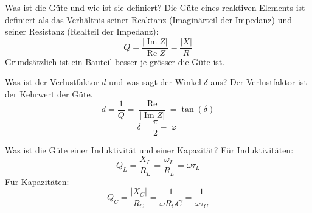 
\begin{karte}{Was ist die Güte und wie ist sie definiert?}
	Die Güte eines reaktiven Elements ist definiert als das Verhältnis seiner Reaktanz (Imaginärteil der Impedanz) und seiner Resistanz (Realteil der Impedanz):\\
	\begin{equation*}
		Q=\frac{|\operatorname{Im} Z|}{\operatorname{Re} Z}=\frac{|X|}{R}
	\end{equation*}
	Grundsätzlich ist ein Bauteil besser je grösser die Güte ist.
\end{karte}

\begin{karte}{Was ist der Verlustfaktor $d$ und was sagt der Winkel $\delta$ aus?}
	Der Verlustfaktor ist der Kehrwert der Güte.
	\begin{equation*}
		d = \frac{1}{Q} = \frac{\operatorname{Re}}{|\operatorname{Im} Z|} = \tan (\delta)
	\end{equation*}
	\begin{equation*}
		\delta = \frac{\pi}{2} - \left|\varphi\right|
	\end{equation*}
\end{karte}

\begin{karte}{Was ist die Güte einer Induktivität und einer Kapazität?}
	Für Induktivitäten:
	\begin{equation*}
		Q_L = \frac{X_L}{R_L} = \frac{\omega_L}{R_L} = \omega \tau_L
	\end{equation*}
	Für Kapazitäten:
	\begin{equation*}
		Q_C = \frac{|X_C|}{R_C} = \frac{1}{\omega R_C C} = \frac{1}{\omega \tau_C}
	\end{equation*}
\end{karte}